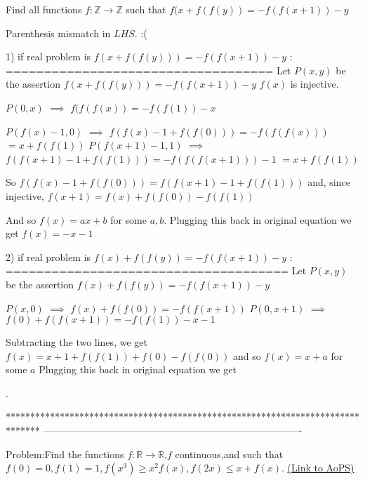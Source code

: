 \begin{solution}
	\begin{tcolorbox}Find all functions $f: \mathbb{Z}\to\mathbb{Z}$ such that $f(x+f(f(y))=-f(f(x+1))-y$\end{tcolorbox}
Parenthesis mismatch in $LHS$. :(

1) if real problem is $f(x+f(f(y)))=-f(f(x+1))-y$ :
===================================
Let $P(x,y)$ be the assertion $f(x+f(f(y)))=-f(f(x+1))-y$
$f(x)$ is injective.

$P(0,x)$ $\implies$ $f(f(f(x))=-f(f(1))-x$

$P(f(x)-1,0)$ $\implies$ $f(f(x)-1+f(f(0)))=-f(f(f(x)))$ $=x+f(f(1))$
$P(f(x+1)-1,1)$ $\implies$ $f(f(x+1)-1+f(f(1)))=-f(f(f(x+1)))-1$ $=x+f(f(1))$

So $f(f(x)-1+f(f(0)))=f(f(x+1)-1+f(f(1)))$ and, since injective, $f(x+1)=f(x)+f(f(0))-f(f(1))$

And so $f(x)=ax+b$ for some $a,b$. Plugging this back in original equation we get $\boxed{f(x)=-x-1}$

2) if real problem is $f(x)+f(f(y))=-f(f(x+1))-y$ :
=====================================
Let $P(x,y)$ be the assertion $f(x)+f(f(y))=-f(f(x+1))-y$

$P(x,0)$ $\implies$ $f(x)+f(f(0))=-f(f(x+1))$
$P(0,x+1)$ $\implies$ $f(0)+f(f(x+1))=-f(f(1))-x-1$

Subtracting the two lines, we get $f(x)=x+1+f(f(1))+f(0)-f(f(0))$ and so $f(x)=x+a$ for some $a$
Plugging this back in original equation we get .
\end{solution}
*******************************************************************************
-------------------------------------------------------------------------------

\begin{problem}
	Problem:Find the functions $f: \mathbb{R}\to\mathbb{R}$,$f$ continuous,and such that
$f(0)=0,f(1)=1,f(x^3){\ge}x^2f(x),f(2x){\leq}x+f(x)$.
	\flushright \href{https://artofproblemsolving.com/community/c6h477424}{(Link to AoPS)}
\end{problem}



